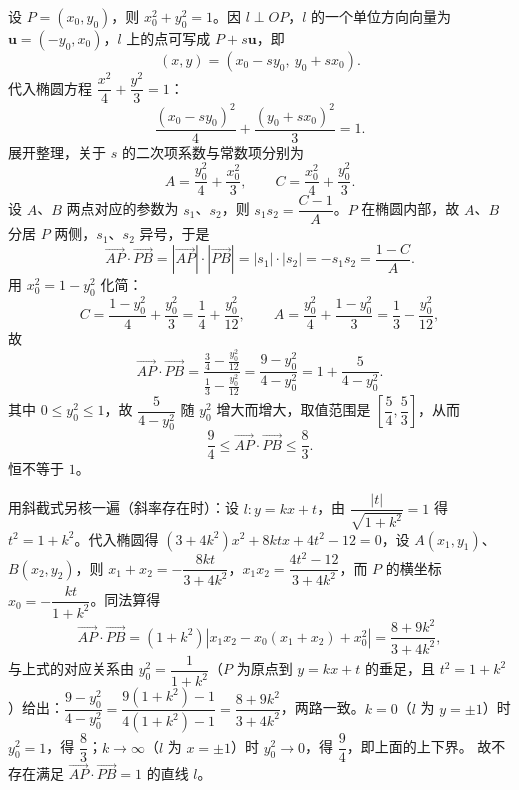 \begin{answer}
设 $P=(x_0,y_0)$，则 $x_0^2+y_0^2=1$。因 $l\perp OP$，$l$ 的一个单位方向向量为 $\boldsymbol u=(-y_0,x_0)$，$l$ 上的点可写成 $P+s\boldsymbol u$，即
\nopagebreak[4]
\[(x,y)=(x_0-sy_0,\ y_0+sx_0).\]
代入椭圆方程 $\dfrac{x^2}{4}+\dfrac{y^2}{3}=1$：
\nopagebreak[4]
\[\frac{(x_0-sy_0)^2}{4}+\frac{(y_0+sx_0)^2}{3}=1.\]
展开整理，关于 $s$ 的二次项系数与常数项分别为
\nopagebreak[4]
\[A=\frac{y_0^2}{4}+\frac{x_0^2}{3},\qquad C=\frac{x_0^2}{4}+\frac{y_0^2}{3}.\]
设 $A$、$B$ 两点对应的参数为 $s_1$、$s_2$，则 $s_1s_2=\dfrac{C-1}{A}$。$P$ 在椭圆内部，故 $A$、$B$ 分居 $P$ 两侧，$s_1$、$s_2$ 异号，于是
\nopagebreak[4]
\[\overrightarrow{AP}\cdot\overrightarrow{PB}=|\overrightarrow{AP}|\cdot|\overrightarrow{PB}|=|s_1|\cdot|s_2|=-s_1s_2=\frac{1-C}{A}.\]
用 $x_0^2=1-y_0^2$ 化简：
\nopagebreak[4]
\[C=\frac{1-y_0^2}{4}+\frac{y_0^2}{3}=\frac14+\frac{y_0^2}{12},\qquad A=\frac{y_0^2}{4}+\frac{1-y_0^2}{3}=\frac13-\frac{y_0^2}{12},\]
故
\nopagebreak[4]
\[\overrightarrow{AP}\cdot\overrightarrow{PB}=\frac{\frac34-\frac{y_0^2}{12}}{\frac13-\frac{y_0^2}{12}}=\frac{9-y_0^2}{4-y_0^2}=1+\frac{5}{4-y_0^2}.\]
其中 $0\leqslant y_0^2\leqslant 1$，故 $\dfrac{5}{4-y_0^2}$ 随 $y_0^2$ 增大而增大，取值范围是 $\left[\dfrac54,\dfrac53\right]$，从而
\nopagebreak[4]
\[\frac94\leqslant\overrightarrow{AP}\cdot\overrightarrow{PB}\leqslant\frac83.\]
恒不等于 $1$。

用斜截式另核一遍（斜率存在时）：设 $l:y=kx+t$，由 $\dfrac{|t|}{\sqrt{1+k^2}}=1$ 得 $t^2=1+k^2$。代入椭圆得 $(3+4k^2)x^2+8ktx+4t^2-12=0$，设 $A(x_1,y_1)$、$B(x_2,y_2)$，则 $x_1+x_2=-\dfrac{8kt}{3+4k^2}$，$x_1x_2=\dfrac{4t^2-12}{3+4k^2}$，而 $P$ 的横坐标 $x_0=-\dfrac{kt}{1+k^2}$。同法算得
\nopagebreak[4]
\[\overrightarrow{AP}\cdot\overrightarrow{PB}=(1+k^2)\left|x_1x_2-x_0(x_1+x_2)+x_0^2\right|=\frac{8+9k^2}{3+4k^2},\]
与上式的对应关系由 $y_0^2=\dfrac{1}{1+k^2}$（$P$ 为原点到 $y=kx+t$ 的垂足，且 $t^2=1+k^2$）给出：$\dfrac{9-y_0^2}{4-y_0^2}=\dfrac{9(1+k^2)-1}{4(1+k^2)-1}=\dfrac{8+9k^2}{3+4k^2}$，两路一致。$k=0$（$l$ 为 $y=\pm1$）时 $y_0^2=1$，得 $\dfrac83$；$k\to\infty$（$l$ 为 $x=\pm1$）时 $y_0^2\to0$，得 $\dfrac94$，即上面的上下界。
故不存在满足 $\overrightarrow{AP}\cdot\overrightarrow{PB}=1$ 的直线 $l$。


\end{answer}
